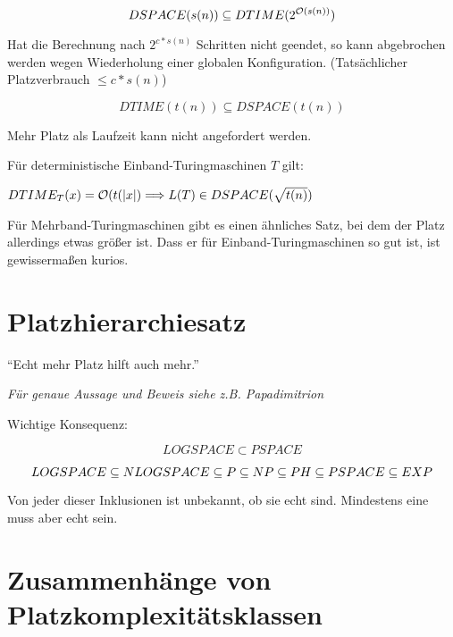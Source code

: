 $$ DSPACE(s(n)) \subseteq DTIME (2^{\mathcal{O}(s(n))}) $$

Hat die Berechnung nach $2^{c*s(n)}$ Schritten nicht geendet, so kann abgebrochen werden wegen Wiederholung einer globalen Konfiguration. (Tatsächlicher Platzverbrauch $\leq c * s(n)$)



$$ DTIME(t(n)) \subseteq DSPACE (t(n)) $$

Mehr Platz als Laufzeit kann nicht angefordert werden.





\begin{satz}

    Für deterministische Einband-Turingmaschinen $T$ gilt:

    $DTIME_T(x) = \mathcal{O}(t(|x|) \Longrightarrow  L(T) \in DSPACE(\sqrt{t(n)})$

    
\end{satz}

Für Mehrband-Turingmaschinen gibt es einen ähnliches Satz, bei dem der Platz allerdings etwas größer ist. Dass er für Einband-Turingmaschinen so gut ist, ist gewissermaßen kurios.





\section{Platzhierarchiesatz}

\begin{satz}
    
    ``Echt mehr Platz hilft auch mehr.''

    \textit{Für genaue Aussage und Beweis siehe z.B. Papadimitrion}
\end{satz}

Wichtige Konsequenz:

$$ LOGSPACE \subset PSPACE $$

$$ LOGSPACE \subseteq NLOGSPACE \subseteq P \subseteq NP \subseteq PH \subseteq PSPACE \subseteq EXP$$

Von jeder dieser Inklusionen ist unbekannt, ob sie echt sind. Mindestens eine muss aber echt sein.






\section{Zusammenhänge von Platzkomplexitätsklassen}


